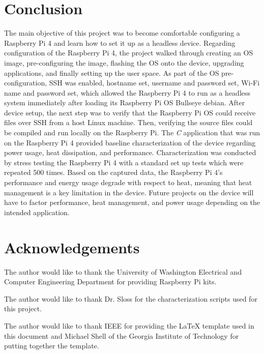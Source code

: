 \documentclass[journal]{IEEEtran}
\begin{document}
    \section{Conclusion}

    The main objective of this project was to become comfortable configuring a Raspberry Pi 4 and learn how to set it up as a headless device.
    Regarding configuration of the Raspberry Pi 4, the project walked through creating an OS image, pre-configuring the image, flashing the OS onto the device, upgrading applications, and finally setting up the user space. 
    As part of the OS pre-configuration, SSH was enabled, hostname set, username and password set, Wi-Fi name and password set, which allowed the Raspberry Pi 4 to run as a headless system immediately after loading its Raspberry Pi OS Bullseye debian.
    After device setup, the next step was to verify that the Raspberry Pi OS could receive files over SSH from a host Linux machine. 
    Then, verifying the source files could be compiled and run locally on the Raspberry Pi.
    The \emph{C} application that was run on the Raspberry Pi 4 provided baseline characterization of the device regarding power usage, heat dissipation, and performance. 
    Characterization was conducted by stress testing the Raspberry Pi 4 with a standard set up tests which were repeated 500 times.
    Based on the captured data, the Raspberry Pi 4's performance and energy usage degrade with respect to heat, meaning that heat management is a key limitation in the device.
    Future projects on the device will have to factor performance, heat management, and power usage depending on the intended application.

    \nocite{*}
    \newpage

    
    

    \newpage
    \section{Acknowledgements}
    The author would like to thank the University of Washington Electrical and Computer Engineering Department for providing Raspberry Pi kits.
    
    The author would like to thank Dr. Sloss for the characterization scripts used for this project.

    The author would like to thank IEEE for providing the LaTeX template used in this document and Michael Shell of the Georgia Institute of Technology for putting together the template.
\end{document}
